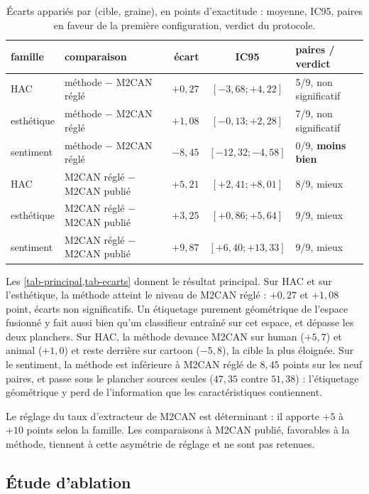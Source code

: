 \documentclass[11pt,a4paper]{article}
\theoremstyle{definition}
\theoremstyle{remark}
\begin{document}
\begin{table}[ht]
\centering
\caption{Écarts appariés par (cible, graine), en points d'exactitude : moyenne, IC95, paires en faveur de la première
  configuration, verdict du protocole.}\label{tab-ecarts}
\small
\begin{tabular}{llrcl}
\toprule
famille & comparaison & écart & IC95 & paires / verdict \\
\midrule
HAC & méthode $-$ M2CAN réglé & $+0{,}27$ & $[-3{,}68 ; +4{,}22]$ & 5/9, non significatif \\
esthétique & méthode $-$ M2CAN réglé & $+1{,}08$ & $[-0{,}13 ; +2{,}28]$ & 7/9, non significatif \\
sentiment & méthode $-$ M2CAN réglé & $-8{,}45$ & $[-12{,}32 ; -4{,}58]$ & 0/9, \textbf{moins bien} \\
\midrule
HAC & M2CAN réglé $-$ M2CAN publié & $+5{,}21$ & $[+2{,}41 ; +8{,}01]$ & 8/9, mieux \\
esthétique & M2CAN réglé $-$ M2CAN publié & $+3{,}25$ & $[+0{,}86 ; +5{,}64]$ & 9/9, mieux \\
sentiment & M2CAN réglé $-$ M2CAN publié & $+9{,}87$ & $[+6{,}40 ; +13{,}33]$ & 9/9, mieux \\
\bottomrule
\end{tabular}
\end{table}

Les \cref{tab-principal,tab-ecarts} donnent le résultat principal. Sur HAC et sur l'esthétique, la méthode atteint le
niveau de M2CAN réglé : $+0{,}27$ et $+1{,}08$ point, écarts non significatifs. Un étiquetage purement géométrique de
l'espace fusionné y fait aussi bien qu'un classifieur entraîné sur cet espace, et dépasse les deux planchers. Sur HAC, la
méthode devance M2CAN sur human ($+5{,}7$) et animal ($+1{,}0$) et reste derrière sur cartoon ($-5{,}8$), la cible la
plus éloignée. Sur le sentiment, la méthode est inférieure à M2CAN réglé de $8{,}45$ points sur les neuf paires, et
passe sous le plancher sources seules ($47{,}35$ contre $51{,}38$) : l'étiquetage géométrique y perd de l'information
que les caractéristiques contiennent.

Le réglage du taux d'extracteur de M2CAN est déterminant : il apporte $+5$ à $+10$ points selon la famille. Les
comparaisons à M2CAN publié, favorables à la méthode, tiennent à cette asymétrie de réglage et ne sont pas retenues.

\subsection{Étude d'ablation}\label{sec-ablation}
\end{document}
